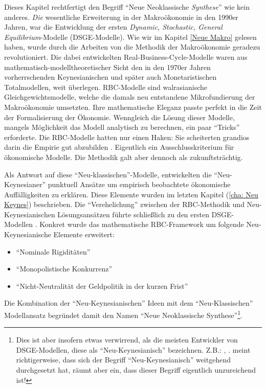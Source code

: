 Dieses Kapitel rechtfertigt den Begriff "`Neue Neoklassische \textit{Synthese}"' wie kein anderes. \textit{Die} wesentliche Erweiterung in der Makroökonomie in den 1990er Jahren, war die Entwicklung der ersten \textit{Dynamic, Stochastic, General Equilibrium}-Modelle (DSGE-Modelle). Wie wir im Kapitel \ref{Neue Makro} gelesen haben, wurde durch die Arbeiten von \textcite{Kydland1982, Plosser1983} die Methodik der Makroökonomie geradezu revolutioniert. Die dabei entwickelten Real-Business-Cycle-Modelle waren aus mathematisch-modelltheoretischer Sicht den in den 1970er Jahren vorherrschenden Keynesianischen und später auch Monetaristischen Totalmodellen, weit überlegen. RBC-Modelle sind walrasianische Gleichgewichtsmodelle, welche die damals neu entstandene Mikrofundierung der Makroökonomie umsetzten. Ihre mathematische Eleganz passte perfekt in die Zeit der Formalisierung der Ökonomie. Wenngleich die Lösung dieser Modelle, mangels Möglichkeit das Modell analytisch zu berechnen, ein paar "`Tricks"' erforderte. Die RBC-Modelle hatten nur einen Haken: Sie scheiterten grandios darin die Empirie gut abzubilden \parencite[S. 309]{Romer2019}. Eigentlich ein Ausschlusskriterium für ökonomische Modelle. Die Methodik galt aber dennoch als zukunftsträchtig. 

Als Antwort auf diese "`Neu-klassischen"'-Modelle, entwickelten die "`Neu-Keynesianer"' punktuell Ansätze um empirisch beobachtete ökonomische Auffälligkeiten zu erklären. Diese Elemente wurden im letzten Kapitel (\ref{cha: Neu Keynes}) beschrieben. Die "`Verehelichung"' zwischen der RBC-Methodik und Neu-Keynesianischen Lösungsansätzen führte schließlich zu den ersten DSGE-Modellen \parencite[S. 5]{Gali2015}. Konkret wurde das mathematische RBC-Framework um folgende Neu-Keynesianische Elemente erweitert:
\begin{itemize}
	\item "`Nominale Rigiditäten"'
	\item "`Monopolistische Konkurrenz"'
	\item "`Nicht-Neutralität der Geldpolitik in der kurzen Frist"'   
\end{itemize}

Die Kombination der "`Neu-Keynesianischen"' Ideen mit dem "`Neu-Klassischen"' Modellansatz begründet damit den Namen "`Neue Neoklassische Synthese"'\footnote{Dies ist aber insofern etwas verwirrend, als die meisten Entwickler von DSGE-Modellen, diese als "`Neu-Keynesianisch"' bezeichnen. Z.B.: \textcite{Gali2015}, \textcite{Romer2019}. \textcite[S. 28]{Gali2007} meint richtigerweise, dass sich der Begriff "`Neu-Keynesianisch"' weitgehend durchgesetzt hat, räumt aber ein, dass dieser Begriff eigentlich unzureichend ist!}.

